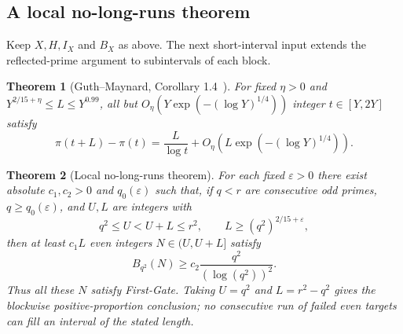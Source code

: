\documentclass[final,11pt]{elsarticle}
\newtheorem{theorem}{Theorem}[section]
\theoremstyle{definition}
\theoremstyle{remark}
\newcommand{\eps}{\varepsilon}
\numberwithin{equation}{section}
\begin{document}
\subsection{A local no-long-runs theorem}
\label{subsec:short-window-failures}

Keep $X,H,I_X$ and $B_X$ as above. The next short-interval input
extends the reflected-prime argument to subintervals of each block.

\begin{theorem}[Guth--Maynard, Corollary 1.4~\cite{GuthMaynard}]
\label{thm:GM-short-primes}
For fixed $\eta>0$ and $Y^{2/15+\eta}\le L\le Y^{0.99}$,
all but $O_\eta(Y\exp(- (\log Y)^{1/4}))$ integer
$t\in[Y,2Y]$ satisfy
\[
 \pi(t+L)-\pi(t)=\frac{L}{\log t}
   +O_\eta\!\left(L\exp(- (\log Y)^{1/4})\right).
\]
\end{theorem}

\begin{theorem}[Local no-long-runs theorem]
\label{thm:local-no-long-runs}
For each fixed $\eps>0$ there exist absolute $c_1,c_2>0$ and
$q_0(\eps)$ such that, if $q<r$ are consecutive odd primes,
$q\ge q_0(\eps)$, and $U,L$ are integers with
\[
 q^2\le U<U+L\le r^2,\qquad L\ge(q^2)^{2/15+\eps},
\]
then at least $c_1L$ even integers $N\in(U,U+L]$ satisfy
\[
 B_{q^2}(N)\ge c_2\frac{q^2}{(\log(q^2))^2}.
\]
Thus all these $N$ satisfy First-Gate. Taking $U=q^2$ and
$L=r^2-q^2$ gives the blockwise positive-proportion conclusion;
no consecutive run of failed even targets can fill an interval
of the stated length.
\end{theorem}
\end{document}

